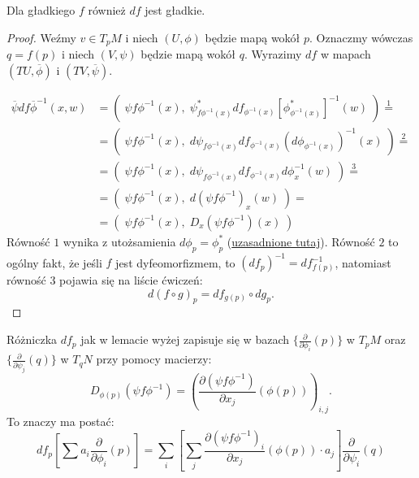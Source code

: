 \begin{lemma}Dla gładkiego $f$ również $df$ jest gładkie.
\end{lemma}

\begin{proof}
  Weźmy $v\in T_pM$ i niech $(U,\phi)$ będzie mapą wokół $p$. Oznaczmy wówczas $q=f(p)$ i niech $(V, \psi)$ będzie mapą wokół $q$. Wyrazimy $df$ w mapach $(TU,\overline{\phi})$ i $(TV,\overline{\psi})$.

  \begin{center}
  \end{center}

  \begin{align*}
    \overline{\psi}df\overline{\phi}^{-1}(x, w)&=(\;\psi f\phi^{-1}(x),\;\psi^*_{f\phi^{-1}(x)}df_{\phi^{-1}(x)}[\phi^*_{\phi^{-1}(x)}]^{-1}(w)\;)\overset{1}{=}\\
                                               &=(\;\psi f\phi^{-1}(x),\; d\psi_{f\phi^{-1}(x)}df_{\phi^{-1}(x)}(d\phi_{\phi^{-1}(x)})^{-1}(x)\;)\overset{2}{=}\\
                                               &=(\;\psi f\phi^{-1}(x),\; d\psi_{f\phi^{-1}(x)}df_{\phi^{-1}(x)}d\phi^{-1}_x(w)\;)\overset{3}{=}\\
                                               &=(\;\psi f\phi^{-1}(x),\;d(\psi f\phi^{-1})_x(w)\;)=\\
                                               &=(\;\psi f\phi^{-1}(x),\;D_x(\psi f\phi^{-1})(x)\;)
  \end{align*}
  Równość $1$ wynika z utożsamienia $d\phi_p=\phi_p^*$ (\hyperref[phi z gwiazdka to d phi]{uzasadnione tutaj}). Równość $2$ to ogólny fakt, że jeśli $f$ jest dyfeomorfizmem, to $(df_p)^{-1}=df^{-1}_{f(p)}$, natomiast równość $3$ pojawia się na liście ćwiczeń: 
  $$d(f\circ g)_p=df_{g(p)}\circ dg_p.$$
\end{proof}

\begin{remark}
  Różniczka $df_p$ jak w lemacie wyżej zapisuje się w bazach $\{\frac{\partial}{\partial\phi_i}(p)\}$ w $T_pM$ oraz $\{\frac{\partial}{\partial\psi_j}(q)\}$ w $T_qN$ przy pomocy macierzy:
  $$D_{\phi(p)}(\psi f\phi^{-1})=\left(\frac{\partial(\psi f\phi^{-1})}{\partial x_j}(\phi(p))\right)_{i,j}.$$
  To znaczy ma postać:
  $$df_p\left[\sum a_i\frac{\partial}{\partial\phi_i}(p)\right]=\sum_i\left[\sum_j\frac{\partial(\psi f\phi^{-1})_i}{\partial x_j}(\phi(p))\cdot a_j\right]\frac{\partial}{\partial\psi_i}(q)$$
\end{remark}

